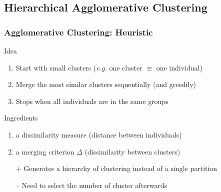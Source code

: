 \documentclass{beamer}\usepackage[]{graphicx}\usepackage[]{color}
\begin{document}
\subsection{Hierarchical Agglomerative Clustering}

\begin{frame}
  \frametitle{Agglomerative Clustering: Heuristic}
    
    \begin{block}{Idea}
      \begin{enumerate}
        \item Start with small clusters (\textit{e.g.} one cluster $\equiv$ one individual)
        \item Merge the most similar clusters sequentially (and greedily)
        \item Stops when all individuals are in the same groups
      \end{enumerate}
    \end{block}

    \begin{block}{Ingredients}
      \begin{enumerate}
        \item a dissimilarity measure (distance between individuals)
        \item a merging criterion $\Delta$ (dissimilarity between clusters)
      \end{enumerate}
    \end{block}

    \begin{itemize}
      \item[+] Generates a hierarchy of clustering instead of a single partition
      \item[--] Need to select the number of cluster afterwards
    \end{itemize}
\end{frame}
\end{document}
